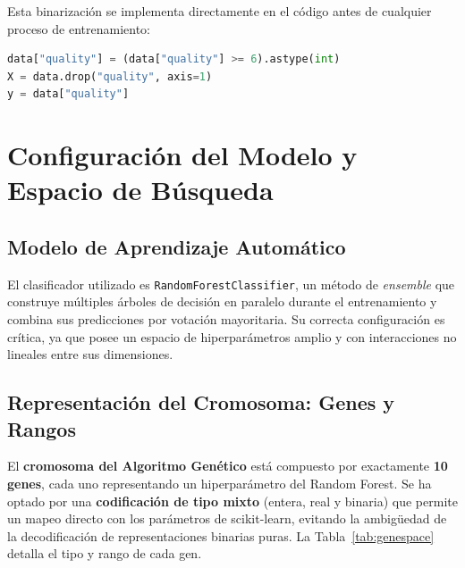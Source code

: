 \documentclass[12pt, a4paper]{article}
\begin{document}
Esta binarización se implementa directamente en el código antes de cualquier proceso de
entrenamiento:

\begin{lstlisting}[language=Python, caption={Transformación binaria de la variable objetivo}]
data["quality"] = (data["quality"] >= 6).astype(int)
X = data.drop("quality", axis=1)
y = data["quality"]
\end{lstlisting}

\section{Configuración del Modelo y Espacio de Búsqueda}

\subsection{Modelo de Aprendizaje Automático}

El clasificador utilizado es \texttt{RandomForestClassifier}, un método de
\textit{ensemble} que construye múltiples árboles de decisión en paralelo durante el
entrenamiento y combina sus predicciones por votación mayoritaria. Su correcta
configuración es crítica, ya que posee un espacio de hiperparámetros amplio y con
interacciones no lineales entre sus dimensiones.

\subsection{Representación del Cromosoma: Genes y Rangos}

El \textbf{cromosoma del Algoritmo Genético} está compuesto por exactamente
\textbf{10 genes}, cada uno representando un hiperparámetro del Random Forest. Se ha
optado por una \textbf{codificación de tipo mixto} (entera, real y binaria) que permite
un mapeo directo con los parámetros de scikit-learn, evitando la ambigüedad de la
decodificación de representaciones binarias puras. La Tabla~\ref{tab:genespace} detalla
el tipo y rango de cada gen.
\end{document}

